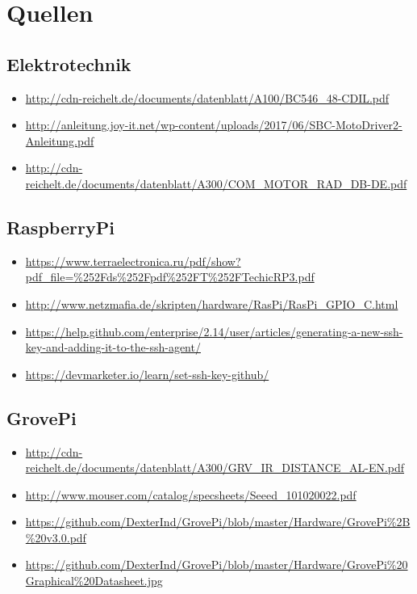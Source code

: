\documentclass{report}
\begin{document}
\section{Quellen}

\subsection{Elektrotechnik}
\begin{itemize}

\item \url{http://cdn-reichelt.de/documents/datenblatt/A100/BC546_48-CDIL.pdf}


\item \url{http://anleitung.joy-it.net/wp-content/uploads/2017/06/SBC-MotoDriver2-Anleitung.pdf}

\item \url{http://cdn-reichelt.de/documents/datenblatt/A300/COM_MOTOR_RAD_DB-DE.pdf}

\end{itemize}

\subsection{RaspberryPi}

\begin{itemize}

\item \url{https://www.terraelectronica.ru/pdf/show?pdf_file=%252Fds%252Fpdf%252FT%252FTechicRP3.pdf}

\item \url{http://www.netzmafia.de/skripten/hardware/RasPi/RasPi_GPIO_C.html}

\item \url{https://help.github.com/enterprise/2.14/user/articles/generating-a-new-ssh-key-and-adding-it-to-the-ssh-agent/}

\item \url{https://devmarketer.io/learn/set-ssh-key-github/}

\end{itemize}

\subsection{GrovePi}

\begin{itemize}

\item \url{http://cdn-reichelt.de/documents/datenblatt/A300/GRV_IR_DISTANCE_AL-EN.pdf}

\item \url{http://www.mouser.com/catalog/specsheets/Seeed_101020022.pdf}

\item \url{https://github.com/DexterInd/GrovePi/blob/master/Hardware/GrovePi%2B%20v3.0.pdf}

\item \url{https://github.com/DexterInd/GrovePi/blob/master/Hardware/GrovePi%20Graphical%20Datasheet.jpg}

\end{itemize}
\end{document}
